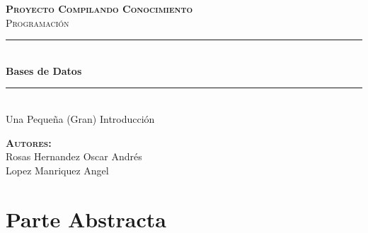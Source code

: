 \documentclass[12pt, fleqn]{report}                             %
\author{Oscar Andrés Rosas}                                     %
\begin{document}
\begin{titlepage}

	\center
	\textbf{\textsc{\Large Proyecto Compilando Conocimiento}}\\[1.0cm] 
	\textsc{\Large Programación}\\[1.0cm] 

	\rule{\linewidth}{0.5mm} \\[1.0cm]
		{ \huge \bfseries Bases de Datos}\\[1.0cm] 
	\rule{\linewidth}{0.5mm} \\[2.0cm]
	
	{\LARGE Una Pequeña (Gran) Introducción}\\[7cm] 
	
	\begin{center} \large
    \textbf{\textsc{Autores:}}\\
        Rosas Hernandez Oscar Andrés \\
        Lopez Manriquez Angel
    \end{center}

	\vfill

\end{titlepage}

\tableofcontents{}
\label{sec:Index}

\clearpage




\part{Parte Abstracta}
\clearpage




\end{document}
